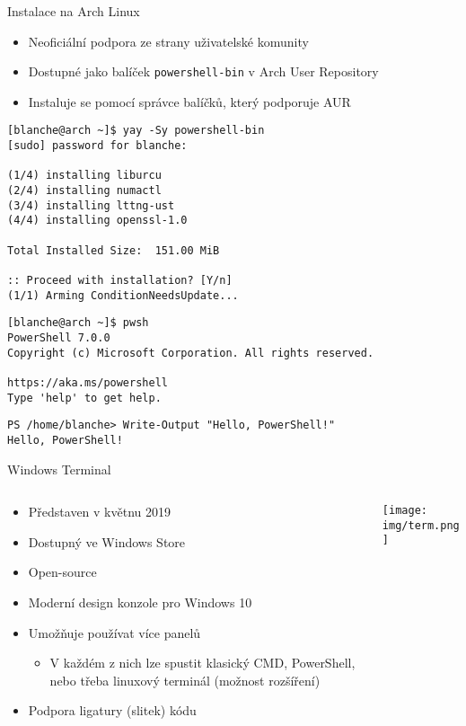 \documentclass[main.tex]{subfiles}
\begin{document}
\begin{frame}{Instalace na Arch Linux}
\begin{itemize}
  \item Neoficiální podpora ze strany uživatelské komunity
  \item Dostupné jako balíček \texttt{powershell-bin} v Arch User Repository
  \item Instaluje se pomocí správce balíčků, který podporuje AUR
\end{itemize}
        \begin{verbatim}
[blanche@arch ~]$ yay -Sy powershell-bin
[sudo] password for blanche:

(1/4) installing liburcu
(2/4) installing numactl
(3/4) installing lttng-ust
(4/4) installing openssl-1.0

Total Installed Size:  151.00 MiB

:: Proceed with installation? [Y/n]
(1/1) Arming ConditionNeedsUpdate...
\end{verbatim}
\framebreak
\begin{verbatim}
[blanche@arch ~]$ pwsh
PowerShell 7.0.0
Copyright (c) Microsoft Corporation. All rights reserved.

https://aka.ms/powershell
Type 'help' to get help.\end{verbatim}
\vspace{-13mm}
\begin{verbatim}
PS /home/blanche> Write-Output "Hello, PowerShell!"
Hello, PowerShell!
\end{verbatim}
\end{frame}

\begin{frame}{Windows Terminal}
  \begin{columns}
    \begin{column}{0.45\textwidth}
 \begin{itemize}
  \item Představen v květnu 2019
  \item Dostupný ve Windows Store
  \item Open-source
  \item Moderní design konzole pro Windows 10
  \item Umožňuje používat více panelů
    \begin{itemize}
      \item V každém z nich lze spustit klasický CMD, PowerShell, nebo třeba linuxový terminál (možnost rozšíření)
    \end{itemize}
  \item Podpora ligatury (slitek) kódu
\end{itemize}
    \end{column}
    \begin{column}{0.55\textwidth}
      \texttt{[image: img/term.png]}
    \end{column}
  \end{columns}
\end{frame}
\end{document}
